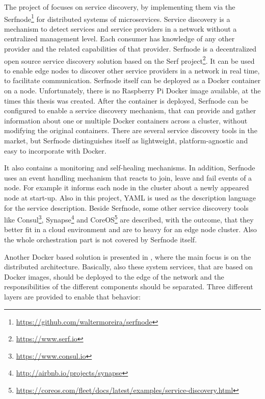 The project of \autocite{Stubbs:2015} focuses on service discovery, by implementing them via the Serfnode\footnote{\url{https://github.com/waltermoreira/serfnode}} for distributed systems of microservices.
Service discovery is a mechanism to detect services and service providers in a network without a centralized management level.
Each consumer has knowledge of any other provider and the related capabilities of that provider.
Serfnode is a decentralized open source service discovery solution based on the Serf project\footnote{\url{https://www.serf.io}}.
It can be used to enable edge nodes to discover other service providers in a network in real time, to facilitate communication.\autocite[cf.][p. 34]{Stubbs:2015}
Serfnode itself can be deployed as a Docker container on a node.
Unfortunately, there is no Raspberry Pi Docker image available, at the times this thesis was created.
After the container is deployed, Serfnode can be configured to enable a service discovery mechanism, that can provide and gather information about one or multiple Docker containers across a cluster, without modifying the original containers.\autocite[cf.][p. 34]{Stubbs:2015}
There are several service discovery tools in the market, but Serfnode distinguishes itself as lightweight, platform-agnostic and easy to incorporate with Docker.\autocite[cf.][p. 34]{Stubbs:2015}

It also contains a monitoring and self-healing mechanisms.\autocite[cf.][p. 34]{Stubbs:2015}
In addition, Serfnode uses an event handling mechanism that reacts to join, leave and fail events of a node.\autocite[cf.][p. 38]{Stubbs:2015}
For example it informs each node in the cluster about a newly appeared node at start-up.\autocite[cf.][p. 37]{Stubbs:2015}
Also in this project, \ac{YAML} is used as the description language for the service description.
Beside Serfnode, some other service discovery tools like Consul\footnote{\url{https://www.consul.io}}, Synapse\footnote{\url{http://airbnb.io/projects/synapse}} and CoreOS\footnote{\url{https://coreos.com/fleet/docs/latest/examples/service-discovery.html}} are described, with the outcome, that they better fit in a cloud environment and are to heavy for an edge node cluster.\autocite[cf.][p. 36]{Stubbs:2015}
Also the whole orchestration part is not covered by Serfnode itself.

Another Docker based solution is presented in \autocite{Rufino:2017}, where the main focus is on the distributed architecture.
Basically, also these system services, that are based on Docker images, should be deployed to the edge of the network and the responsibilities of the different components should be separated.
Three different layers are provided to enable that behavior:


